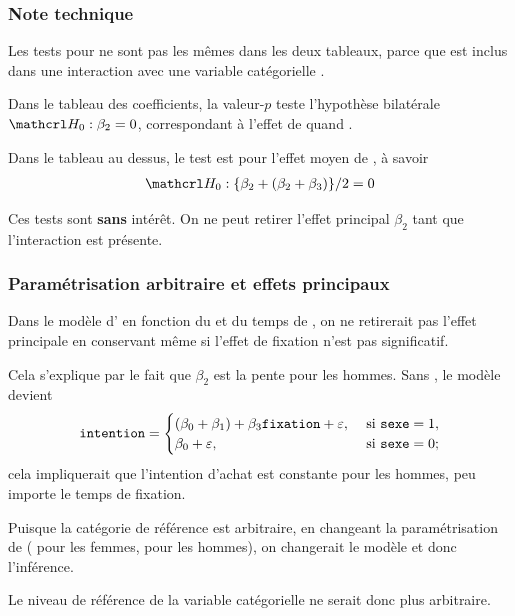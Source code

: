 \documentclass[xcolor={dvipsnames}]{beamer}
\begin{document}
 \begin{frame}
\frametitle{Note technique}
\bi
\item Les tests pour  ne sont pas les mêmes dans les deux tableaux, parce que   est inclus dans une interaction avec une variable catégorielle .
\item Dans le tableau des coefficients, la valeur-$p$ teste l'hypothèse bilatérale $\Hy_0:\beta_2=0$, correspondant à l'effet de 
quand .
\item Dans le tableau au dessus, le test est pour l'effet moyen de , à savoir
\begin{align*}
\Hy_0: \{\beta_2+(\beta_2+\beta_3)\}/2=0
\end{align*}
\item Ces tests sont \textbf{sans} intérêt. On ne peut retirer l'effet principal $\beta_2$ tant que l'interaction est présente.
\ei
\end{frame}
 \begin{frame}
  \frametitle{Paramétrisation arbitraire et effets principaux}
  \bi \item Dans le modèle d' en fonction du  et du temps de ,  on ne retirerait pas l'effet principale  en conservant  même si l'effet de fixation n'est pas significatif.
  \item Cela s'explique par le fait que $\beta_2$ est la pente pour les hommes. Sans , le modèle devient 
\begin{align*}
\texttt{intention} = 
\begin{cases}
(\beta_0 + \beta_1) + \beta_3\texttt{fixation} + \varepsilon, & \text{ si } \texttt{sexe}=1,\\
  \beta_0 + \varepsilon, & \text{ si } \texttt{sexe}=0;                 
\end{cases}
\end{align*}  
cela impliquerait que l'intention d'achat est constante pour les hommes, peu importe le temps de fixation.
\item Puisque la catégorie de référence est arbitraire, en changeant la paramétrisation de  ( pour les femmes,  pour les hommes), on changerait le modèle et donc l'inférence.
\item Le niveau de référence de la variable catégorielle ne serait donc plus arbitraire.
\ei
 \end{frame}
\end{document}

